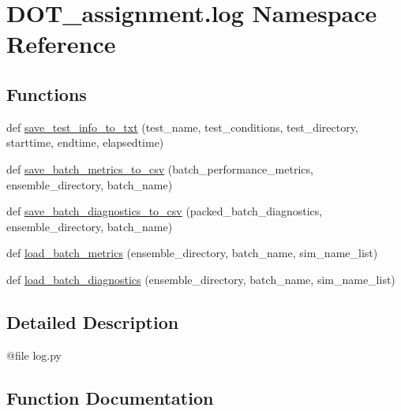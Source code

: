 \hypertarget{namespace_d_o_t__assignment_1_1log}{}\section{D\+O\+T\+\_\+assignment.\+log Namespace Reference}
\label{namespace_d_o_t__assignment_1_1log}
\subsection*{Functions}
\begin{DoxyCompactItemize}
\item 
def \mbox{\hyperlink{namespace_d_o_t__assignment_1_1log_ab59d5c33559471fa2b12e4cec9729c33}{save\+\_\+test\+\_\+info\+\_\+to\+\_\+txt}} (test\+\_\+name, test\+\_\+conditions, test\+\_\+directory, starttime, endtime, elapsedtime)
\item 
def \mbox{\hyperlink{namespace_d_o_t__assignment_1_1log_a0db41021d90343a12b794eb06ccf6bc2}{save\+\_\+batch\+\_\+metrics\+\_\+to\+\_\+csv}} (batch\+\_\+performance\+\_\+metrics, ensemble\+\_\+directory, batch\+\_\+name)
\item 
def \mbox{\hyperlink{namespace_d_o_t__assignment_1_1log_a5acdb4dd21c8075f05ff8c11f000e3c5}{save\+\_\+batch\+\_\+diagnostics\+\_\+to\+\_\+csv}} (packed\+\_\+batch\+\_\+diagnostics, ensemble\+\_\+directory, batch\+\_\+name)
\item 
def \mbox{\hyperlink{namespace_d_o_t__assignment_1_1log_a8d9bed4ad94f6b0b8126c8c0305603dc}{load\+\_\+batch\+\_\+metrics}} (ensemble\+\_\+directory, batch\+\_\+name, sim\+\_\+name\+\_\+list)
\item 
def \mbox{\hyperlink{namespace_d_o_t__assignment_1_1log_aee27c0ef6405589fba965574a59e74d2}{load\+\_\+batch\+\_\+diagnostics}} (ensemble\+\_\+directory, batch\+\_\+name, sim\+\_\+name\+\_\+list)
\end{DoxyCompactItemize}


\subsection{Detailed Description}
\begin{DoxyVerb}@file log.py
\end{DoxyVerb}
 

\subsection{Function Documentation}
\mbox{\label{namespace_d_o_t__assignment_1_1log_aee27c0ef6405589fba965574a59e74d2}} 

